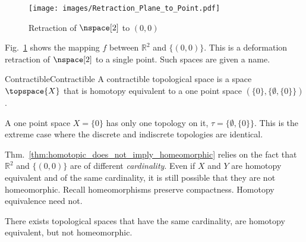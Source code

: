 \documentclass{book}                                                           %
\begin{document}
                \begin{figure}
                    \captionsetup{type=figure}
                    \centering
                    \texttt{[image: images/Retraction\_Plane\_to\_Point.pdf]}
                    \caption{Retraction of $\nspace[2]$ to $(0,0)$}
                    \label{fig:homotopy_equivalence_of_plane_with_point}
                \end{figure}
                Fig.~\ref{fig:homotopy_equivalence_of_plane_with_point}
                shows the mapping $f$ between $\mathbb{R}^{2}$ and $\{(0,0)\}$.
                This is a deformation retraction of $\nspace[2]$ to a single
                point. Such spaces are given a name.
                \begin{fdefinition}{Contractible}{Contractible}
                    A contractible topological space is a space $\topspace{X}$
                    that is homotopy equivalent to a one point space
                    $(\{0\},\{\emptyset,\{0\}\})$.
                \end{fdefinition}
                A one point space $X=\{0\}$ has only one topology on it,
                $\tau=\{\emptyset,\{0\}\}$. This is the extreme case where the
                discrete and indiscrete topologies are identical.
                \par\hfill\par
                Thm.~\ref{thm:homotopic_does_not_imply_homeomorphic} relies on
                the fact that $\mathbb{R}^{2}$ and $\{(0,0)\}$ are of different
                \textit{cardinality}. Even if $X$ and $Y$ are homotopy
                equivalent and of the same cardinality, it is still possible
                that they are not homeomorphic. Recall homeomorphisms
                preserve compactness. Homotopy equivalence need not.
                \begin{theorem}
                    \label{thm:HE_of_Punc_Plane_and_Circle_Not_Homeo}%
                    There exists topological spaces that have the same
                    cardinality, are homotopy equivalent, but not homeomorphic.
                \end{theorem}
\end{document}
